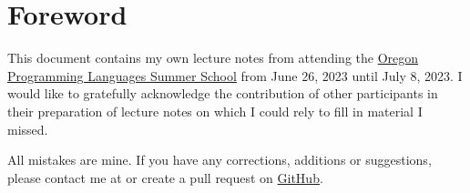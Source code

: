 \section{Foreword}

This document contains my own lecture notes from attending the 
\href{https://www.cs.uoregon.edu/research/summerschool/summer23/}{Oregon Programming Languages Summer School}
from June 26, 2023 until July 8, 2023. I would like to gratefully acknowledge the contribution
of other participants in their preparation of lecture notes on which I could rely to fill in material I missed.

All mistakes are mine. If you have any corrections, additions or suggestions, please contact me
at \emaillink or create a pull request on \href{https://github.com/Eladkay/OPLSS23LectureNotes}{GitHub}.
